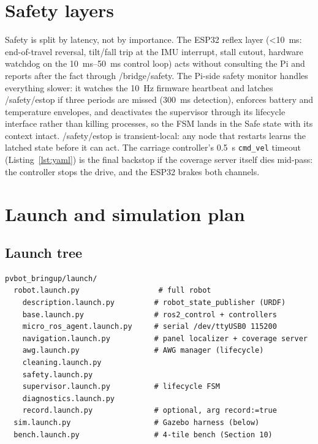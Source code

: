 \documentclass[11pt,a4paper]{article}
\newcommand{\topic}[1]{{\ttfamily\def\_{\textunderscore\allowbreak}#1}}
\begin{document}
\section{Safety layers}
\label{sec:safety}
Safety is split by latency, not by importance. The ESP32 reflex layer
(\SI{<10}{\milli\second}: end-of-travel reversal, tilt/fall trip at the IMU interrupt,
stall cutout, hardware watchdog on the \SIrange{10}{50}{\milli\second} control
loop) acts without consulting the Pi and reports after the fact through
\topic{/bridge/safety}. The Pi-side safety monitor handles everything slower: it
watches the \SI{10}{\hertz} firmware heartbeat and latches \topic{/safety/estop}
if three periods are missed (\SI{300}{\milli\second} detection), enforces battery
and temperature envelopes, and deactivates the supervisor through its lifecycle
interface rather than killing processes, so the FSM lands in the Safe state with
its context intact. \topic{/safety/estop} is transient-local: any node that
restarts learns the latched state before it can act. The carriage controller's
\SI{0.5}{\second} \texttt{cmd\_vel} timeout (Listing~\ref{lst:yaml}) is the final
backstop if the coverage server itself dies mid-pass: the controller stops the
drive, and the ESP32 brakes both channels.

\section{Launch and simulation plan}

\subsection{Launch tree}
\begin{lstlisting}[caption={Bringup launch tree. Each leaf is independently
testable; the bench omits the left branch entirely.}, label={lst:launch}]
pvbot_bringup/launch/
  robot.launch.py                  # full robot
    description.launch.py         # robot_state_publisher (URDF)
    base.launch.py                # ros2_control + controllers
    micro_ros_agent.launch.py     # serial /dev/ttyUSB0 115200
    navigation.launch.py          # panel localizer + coverage server
    awg.launch.py                 # AWG manager (lifecycle)
    cleaning.launch.py
    safety.launch.py
    supervisor.launch.py          # lifecycle FSM
    diagnostics.launch.py
    record.launch.py              # optional, arg record:=true
  sim.launch.py                   # Gazebo harness (below)
  bench.launch.py                 # 4-tile bench (Section 10)
\end{lstlisting}
\end{document}

